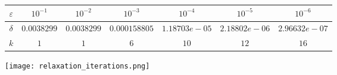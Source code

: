 \begin{tabular}{|c|cccccc|}
\hline
$\varepsilon$&$10^{-1}$&$10^{-2}$&$10^{-3}$&$10^{-4}$&$10^{-5}$&$10^{-6}$\\
\hline
$\delta$&$0.0038299
$&$0.0038299
$&$0.000158805
$&$1.18703e-05
$&$2.18802e-06
$&$2.96632e-07
$\\
\hline
$k$&$1
$&$1
$&$6
$&$10
$&$12
$&$16
$\\
\hline
\end{tabular}

\texttt{[image: relaxation\_iterations.png]}